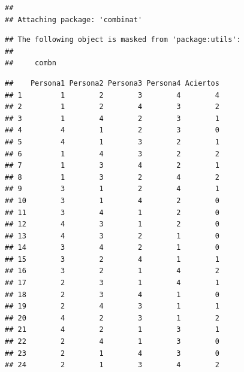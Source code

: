 \documentclass[]{article}
\newenvironment{Shaded}{\begin{snugshade}}{\end{snugshade}}
\newcommand{\ControlFlowTok}[1]{\textcolor[rgb]{0.13,0.29,0.53}{\textbf{#1}}}
\newcommand{\DataTypeTok}[1]{\textcolor[rgb]{0.13,0.29,0.53}{#1}}
\newcommand{\DecValTok}[1]{\textcolor[rgb]{0.00,0.00,0.81}{#1}}
\newcommand{\KeywordTok}[1]{\textcolor[rgb]{0.13,0.29,0.53}{\textbf{#1}}}
\newcommand{\NormalTok}[1]{#1}
\newcommand{\OperatorTok}[1]{\textcolor[rgb]{0.81,0.36,0.00}{\textbf{#1}}}
\newcommand{\OtherTok}[1]{\textcolor[rgb]{0.56,0.35,0.01}{#1}}
\newcommand{\StringTok}[1]{\textcolor[rgb]{0.31,0.60,0.02}{#1}}
\begin{document}
\begin{verbatim}
## 
## Attaching package: 'combinat'
\end{verbatim}

\begin{verbatim}
## The following object is masked from 'package:utils':
## 
##     combn
\end{verbatim}

\begin{Shaded}
\end{Shaded}

\begin{verbatim}
##    Persona1 Persona2 Persona3 Persona4 Aciertos
## 1         1        2        3        4        4
## 2         1        2        4        3        2
## 3         1        4        2        3        1
## 4         4        1        2        3        0
## 5         4        1        3        2        1
## 6         1        4        3        2        2
## 7         1        3        4        2        1
## 8         1        3        2        4        2
## 9         3        1        2        4        1
## 10        3        1        4        2        0
## 11        3        4        1        2        0
## 12        4        3        1        2        0
## 13        4        3        2        1        0
## 14        3        4        2        1        0
## 15        3        2        4        1        1
## 16        3        2        1        4        2
## 17        2        3        1        4        1
## 18        2        3        4        1        0
## 19        2        4        3        1        1
## 20        4        2        3        1        2
## 21        4        2        1        3        1
## 22        2        4        1        3        0
## 23        2        1        4        3        0
## 24        2        1        3        4        2
\end{verbatim}
\end{document}

